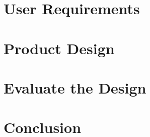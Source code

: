 \documentclass[11pt,oneside]{book}
\begin{document}
\chapter{User Requirements}


\chapter{Product Design}


\chapter{Evaluate the Design}


\chapter{Conclusion}







\end{document}
